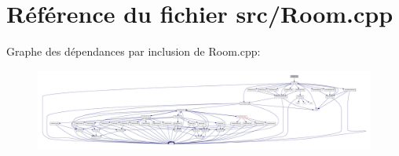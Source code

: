 \section{Référence du fichier src/\-Room.cpp}
\label{_room_8cpp}
Graphe des dépendances par inclusion de Room.\-cpp\-:
\nopagebreak
\begin{figure}[H]
\begin{center}
\leavevmode
\includegraphics[width=350pt]{_room_8cpp__incl}
\end{center}
\end{figure}
